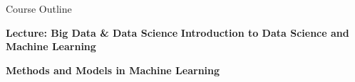 \documentclass[document.tex]{subfiles}
\begin{document}
    \begin{frame}{Course Outline}
        \begin{minipage}[t]{.5\textwidth}
            \textbf{Lecture: Big Data \& Data Science}
            \tableofcontents[hideallsubsections]       
            \vspace{4.22mm}
            \textbf{Introduction to Data Science and Machine Learning}
            \vspace{1.22mm}
            \tableofcontents[hideallsubsections, sections={1-7}, part=1]  
        \end{minipage}%
        \begin{minipage}[t]{.5\textwidth}
            \textbf{Methods and Models in Machine Learning}
            \tableofcontents[hideallsubsections, sections={5-9}, part=2]
        \end{minipage}
    \end{frame}
\end{document}
